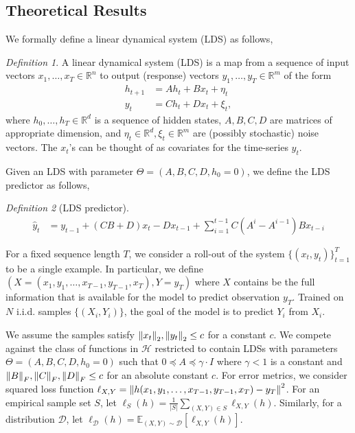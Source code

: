 \documentclass[10pt]{article} \usepackage[accepted]{tmlr}
\theoremstyle{plain}
\theoremstyle{definition}
\newtheorem{definition}[theorem]{Definition}
\theoremstyle{remark}
\def\E{\mathbb E}
\newcommand{\reals}{\mathbb{R}}
\newcommand{\Dcal}{\mathcal{D}}
\newcommand{\Hcal}{\mathcal{H}}
\newtheorem{definition}{Definition}
\let\originalleft\left
\let\originalright\right
\renewcommand{\left}{\mathopen{}\mathclose\bgroup\originalleft}
\renewcommand{\right}{\aftergroup\egroup\originalright}
\newcommand{\norm}[1]{\left\|{#1}\right\|}
\begin{document}
\subsection{Theoretical Results}
\label{sec:theoryp1}
We formally define a linear dynamical system (LDS) as follows,
\begin{definition}
A linear dynamical system (LDS) is a map from a sequence of input vectors $x_1, \ldots, x_T \in \reals^n$ to output (response) vectors $y_1, \ldots, y_T \in \reals^m$ of the form
\begin{align}
h_{t+1} &= A h_t + B x_t + \eta_t \\
y_t &= C h_t + D x_t + \xi_t,
\end{align}
where $h_0, \ldots, h_T \in \reals^d$ is a sequence of hidden states, $A,B,C,D$ are matrices of appropriate dimension, and $\eta_t \in \reals^d, \xi_t \in \reals^m$ are (possibly stochastic) noise vectors. The $x_t$'s can be thought of as covariates for the time-series $y_t$.
\end{definition}
Given an LDS with parameter $\Theta = (A,B,C,D,h_0 = 0)$, we define the LDS predictor as follows,
\begin{definition}[LDS predictor]
\begin{align}
\hat y_t &= y_{t-1} + (CB + D)x_t - Dx_{t-1} + \sum_{i=1}^{t-1} C(A^i - A^{i-1})Bx_{t-i}
\end{align}
\end{definition}

For a fixed sequence length $T$, we consider a roll-out of the system $\{ (x_t, y_t) \}_{t=1}^T$ to be a single example. In particular, we define $(X = (x_1, y_1, \ldots, x_{T-1}, y_{T-1}, x_T), Y = y_T)$ where $X$ contains be the full information that is available for the model to predict observation $y_T$. Trained on $N$ i.i.d. samples $\{(X_i, Y_i)\}$, the goal of the model is to predict $Y_i$ from $X_i$. 

We assume the samples satisfy $\norm{x_t}_2, \norm{y_{t}}_2 \leq c$ for a constant $c$. We compete against the class of functions in $\Hcal$ restricted to contain LDSs with parameters $\Theta = (A,B,C,D,h_0 = 0)$ such that $0 \preccurlyeq A \preccurlyeq \gamma \cdot I$ where $\gamma<1$ is a constant and $\norm{B}_F, \norm{C}_F, \norm{D}_F\le c$ for an absolute constant $c$. For error metrics, we consider squared loss function $\ell_{X,Y} = \norm{h(x_1, y_1, \ldots, x_{T-1}, y_{T-1}, x_T)-y_T}^2$. For an empirical sample set $S$, let $\ell_S(h) = \frac{1}{|S|} \sum_{(X,Y) \in S} \ell_{X,Y}(h)$. Similarly, for a distribution $\Dcal$, let $\ell_\Dcal(h) = \E_{(X,Y) \sim \Dcal} [\ell_{X,Y}(h)]$.
\end{document}
